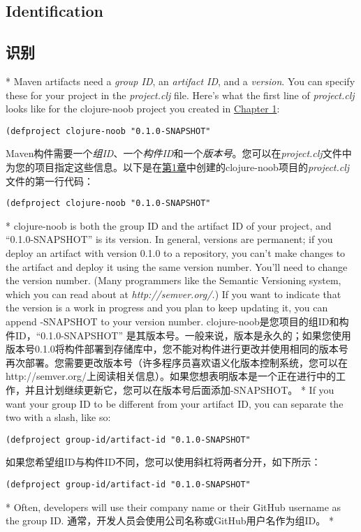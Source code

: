 \documentclass{book}
\begin{document}
\begin{paracol}{2}
\subsection{Identification}
\switchcolumn
\subsection{识别}
\switchcolumn[0]*
Maven artifacts need a \emph{group ID}, an \emph{artifact ID}, and a
\emph{version}. You can specify these for your project in the
\emph{project.clj} file. Here's what the first line of
\emph{project.clj} looks like for the clojure-noob project you created
in \href{javascript:void(0)}{Chapter 1}:
\begin{verbatim}
(defproject clojure-noob "0.1.0-SNAPSHOT"
\end{verbatim}
\switchcolumn
Maven构件需要一个\emph{组ID}、一个\emph{构件ID}和一个\emph{版本号}。您可以在\emph{project.clj}文件中为您的项目指定这些信息。以下是在\href{javascript:void(0)}{第1章}中创建的clojure-noob项目的\emph{project.clj}文件的第一行代码：
\begin{verbatim}
(defproject clojure-noob "0.1.0-SNAPSHOT"
\end{verbatim}
\switchcolumn[0]*
clojure-noob is both the group ID and the artifact ID of your project,
and ``0.1.0-SNAPSHOT'' is its version. In general, versions are permanent;
if you deploy an artifact with version 0.1.0 to a repository, you can't
make changes to the artifact and deploy it using the same version
number. You'll need to change the version number. (Many programmers like
the Semantic Versioning system, which you can read about at
\emph{http://semver.org/.}) If you want to indicate that the version is
a work in progress and you plan to keep updating it, you can append
-SNAPSHOT to your version number.
\switchcolumn
clojure-noob是您项目的组ID和构件ID，``0.1.0-SNAPSHOT'' 是其版本号。一般来说，版本是永久的；如果您使用版本号0.1.0将构件部署到存储库中，您不能对构件进行更改并使用相同的版本号再次部署。您需要更改版本号（许多程序员喜欢语义化版本控制系统，您可以在http://semver.org/上阅读相关信息）。如果您想表明版本是一个正在进行中的工作，并且计划继续更新它，您可以在版本号后面添加-SNAPSHOT。
\switchcolumn[0]*
If you want your group ID to be different from your artifact ID, you can
separate the two with a slash, like so:
\begin{verbatim}
(defproject group-id/artifact-id "0.1.0-SNAPSHOT"
\end{verbatim}
\switchcolumn
如果您希望组ID与构件ID不同，您可以使用斜杠将两者分开，如下所示：
\begin{verbatim}
(defproject group-id/artifact-id "0.1.0-SNAPSHOT"
\end{verbatim}
\switchcolumn[0]*
Often, developers will use their company name or their GitHub username
as the group ID.
\switchcolumn
通常，开发人员会使用公司名称或GitHub用户名作为组ID。
\switchcolumn[0]*

\end{paracol}
\end{document}
